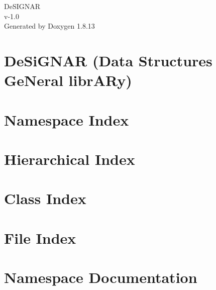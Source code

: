 \documentclass[twoside]{book}
\newcommand{\+}{\discretionary{\mbox{\scriptsize$\hookleftarrow$}}{}{}}
\newcommand{\clearemptydoublepage}{%
  \newpage{\pagestyle{empty}\cleardoublepage}%
}
\begin{document}
\hypersetup{pageanchor=false,
             bookmarksnumbered=true,
             pdfencoding=unicode
            }
\begin{titlepage}
\vspace*{7cm}
\begin{center}%
{\Large De\+S\+I\+G\+N\+AR \\[1ex]\large v-\/1.\+0 }\\
\vspace*{1cm}
{\large Generated by Doxygen 1.8.13}\\
\end{center}
\end{titlepage}
\clearemptydoublepage
{}
\tableofcontents
\clearemptydoublepage
{}
\hypersetup{pageanchor=true}

\chapter{De\+Si\+G\+N\+AR (Data Structures Ge\+Neral libr\+A\+Ry)}
\label{index}\hypertarget{index}{}
\chapter{Namespace Index}

\chapter{Hierarchical Index}

\chapter{Class Index}

\chapter{File Index}

\chapter{Namespace Documentation}

\end{document}
